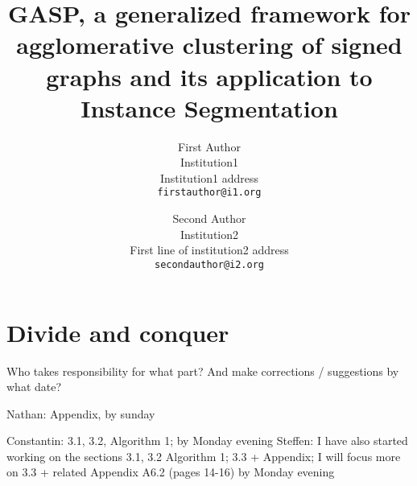 \documentclass[10pt,twocolumn,letterpaper]{article}
\newcommand\TODO[1]{{\color{red}{TODO: #1}}}
\theoremstyle{definition}
\theoremstyle{remark}
\begin{document}
\title{GASP, a generalized framework for agglomerative clustering of signed graphs and its application to Instance Segmentation} %

\author{First Author\\
Institution1\\
Institution1 address\\
{\tt\small firstauthor@i1.org}
\and
Second Author\\
Institution2\\
First line of institution2 address\\
{\tt\small secondauthor@i2.org}
}

\maketitle
\ificcvfinal\thispagestyle{empty}\fi











% 



{\small


}

\clearpage


\section*{Divide and conquer}
\TODO{}
Who takes responsibility for what part? And make corrections / suggestions by what date?

Nathan: Appendix, by sunday

Constantin: 3.1, 3.2, Algorithm 1; by Monday evening
Steffen: I have also started working on the sections
         3.1, 3.2 Algorithm 1; 3.3 + Appendix;
         I will focus more on 3.3 + related Appendix A6.2 (pages 14-16)
         by Monday evening
    
\end{document}
